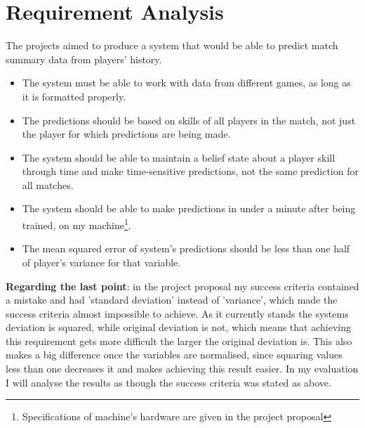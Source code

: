 \documentclass[12pt,a4paper]{book}
\begin{document}
\section{Requirement Analysis}
The projects aimed to produce a system that would be able to predict match summary data from players' history.
\begin{itemize}
\item The system must be able to work with data from different games, as long as it is formatted properly.
\item The predictions should be based on skills of all players in the match, not just the player for which predictions are being made.
\item The system should be able to maintain a belief state about a player skill through time and make time-sensitive predictions, not the same prediction for all matches.
\item The system should be able to make predictions in under a minute after being trained, on my machine\footnote{Specifications of machine's hardware are given in the project proposal}.
\item The mean squared error of system's predictions should be less than one half of player's variance for that variable.
\end{itemize}
\label{requirements-error}
\textbf{Regarding the last point}: in the project proposal my success criteria contained a mistake and had 'standard deviation' instead of 'variance', which made the success criteria almost impossible to achieve.
As it currently stands the systems deviation is squared, while original deviation is not, which means that achieving this requirement gets more difficult the larger the original deviation is.
This also makes a big difference once the variables are normalised, since squaring values less than one decreases it and makes achieving this result easier.
In my evaluation I will analyse the results as though the success criteria was stated as above.
\end{document}
